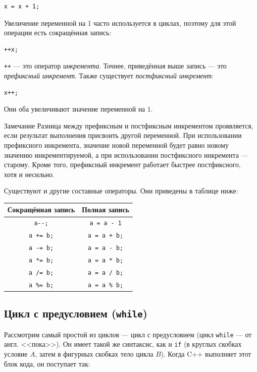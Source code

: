 \documentclass{article}
\newcommand{\tabularII}[1]{\begin{center}\begin{tabular}{|c|c|} #1 \end{tabular}\end{center}}
\newcommand{\note}[1]{
	\begin{sectionenv}[yellow!30!white]{Замечание}
		#1
	\end{sectionenv}
}
\begin{document}
	\begin{lstlisting}
x = x + 1;
	\end{lstlisting}
	
	Увеличение переменной на 1 часто используется в циклах, поэтому для этой операции есть сокращённая запись:
	
	\begin{lstlisting}
++x;
	\end{lstlisting}
	
	\texttt{++} --- это оператор \textit{инкремента}. Точнее, приведённая выше запись --- это \textit{префиксный инкремент}. Также существует \textit{постфиксный инкремент}:
	
	\begin{lstlisting}
x++;
	\end{lstlisting}
	
	Они оба увеличивают значение переменной на $1$. 
	
	\note{Разница между префиксным и постфиксным инкрементом проявляется, если результат выполнения присвоить другой переменной. При использовании префиксного инкремента, значение новой переменной будет равно новому значению инкрементируемой, а при использовании постфиксного инкремента --- старому. Кроме того, префиксный инкремент работает быстрее постфиксного, хотя и несильно.}
	
	Существуют и другие составные операторы. Они приведены в таблице ниже:
	
	\tabularII{
		\hline
		\textbf{Сокращённая запись} & \textbf{Полная запись}\\
		\hline
		\texttt{a-{}-;} & \texttt{a = a - 1}\\
		\hline
		\texttt{a += b;} & \texttt{a = a + b;}\\
		\hline
		\texttt{a -= b;} & \texttt{a = a - b;}\\
		\hline
		\texttt{a *= b;} & \texttt{a = a * b;}\\
		\hline
		\texttt{a /= b;} & \texttt{a = a / b;}\\
		\hline
		\texttt{a \%= b;} & \texttt{a = a \% b;}\\
		\hline
	}
	
	\subsection{Цикл с предусловием (\texttt{while})}
	
	Рассмотрим самый простой из циклов --- цикл с предусловием (цикл \texttt{while} --- от англ. <<пока>>). Он имеет такой же синтаксис, как и \texttt{if} (в круглых скобках условие $A$, затем в фигурных скобках тело цикла $B$). Когда C++ выполняет этот блок кода, он поступает так:
	
\end{document}
